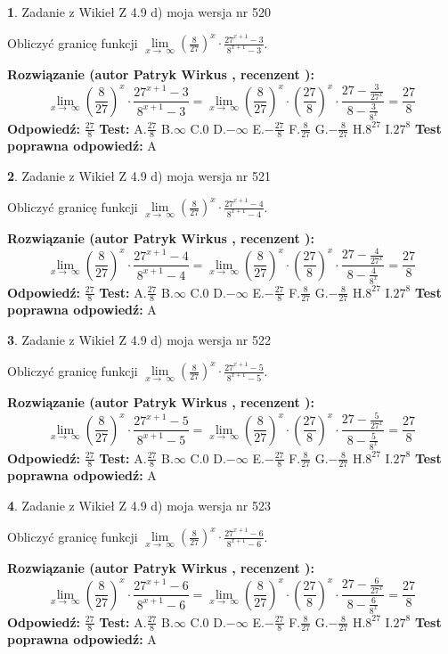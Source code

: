\documentclass[12pt, a4paper]{article}
\theoremstyle{definition} %
\newtheorem{zad}{}
\newcommand{\zadStart}[1]{\begin{zad}#1\newline}
\newcommand{\zadStop}{\end{zad}}
\newcommand{\rozwStart}[2]{\noindent \textbf{Rozwiązanie (autor #1 , recenzent #2): }\newline}
\newcommand{\rozwStop}{\newline}
\newcommand{\odpStart}{\noindent \textbf{Odpowiedź:}\newline}
\newcommand{\odpStop}{\newline}
\newcommand{\testStart}{\noindent \textbf{Test:}\newline}
\newcommand{\testStop}{\newline}
\newcommand{\kluczStart}{\noindent \textbf{Test poprawna odpowiedź:}\newline}
\newcommand{\kluczStop}{\newline}
\begin{document}
\zadStart{Zadanie z Wikieł Z 4.9 d) moja wersja nr 520}


Obliczyć granicę funkcji  $\lim\limits_{x\to\ \infty}(\frac{8}{27})^{x}\cdot\frac{27^{x+1}-3}{8^{x+1}-3}$.
\zadStop
\rozwStart{Patryk Wirkus}{}
$$\lim\limits_{x\to\ \infty}(\frac{8}{27})^{x}\cdot\frac{27^{x+1}-3}{8^{x+1}-3}=\lim\limits_{x\to\ \infty}(\frac{8}{27})^{x}\cdot(\frac{27}{8})^{x} \cdot \frac{27-\frac{3}{27^{x}}}{8-\frac{3}{8^{x}}} = \frac{27}{8}$$
\rozwStop
\odpStart
$\frac{27}{8}$
\odpStop
\testStart
A.$\frac{27}{8}$ B.$\infty$ C.$0$ D.$-\infty$ E.$-\frac{27}{8}$
F.$\frac{8}{27}$ G.$-\frac{8}{27}$
H.$8^{27}$
I.$27^{8}$
\testStop
\kluczStart
A
\kluczStop



\zadStart{Zadanie z Wikieł Z 4.9 d) moja wersja nr 521}


Obliczyć granicę funkcji  $\lim\limits_{x\to\ \infty}(\frac{8}{27})^{x}\cdot\frac{27^{x+1}-4}{8^{x+1}-4}$.
\zadStop
\rozwStart{Patryk Wirkus}{}
$$\lim\limits_{x\to\ \infty}(\frac{8}{27})^{x}\cdot\frac{27^{x+1}-4}{8^{x+1}-4}=\lim\limits_{x\to\ \infty}(\frac{8}{27})^{x}\cdot(\frac{27}{8})^{x} \cdot \frac{27-\frac{4}{27^{x}}}{8-\frac{4}{8^{x}}} = \frac{27}{8}$$
\rozwStop
\odpStart
$\frac{27}{8}$
\odpStop
\testStart
A.$\frac{27}{8}$ B.$\infty$ C.$0$ D.$-\infty$ E.$-\frac{27}{8}$
F.$\frac{8}{27}$ G.$-\frac{8}{27}$
H.$8^{27}$
I.$27^{8}$
\testStop
\kluczStart
A
\kluczStop



\zadStart{Zadanie z Wikieł Z 4.9 d) moja wersja nr 522}


Obliczyć granicę funkcji  $\lim\limits_{x\to\ \infty}(\frac{8}{27})^{x}\cdot\frac{27^{x+1}-5}{8^{x+1}-5}$.
\zadStop
\rozwStart{Patryk Wirkus}{}
$$\lim\limits_{x\to\ \infty}(\frac{8}{27})^{x}\cdot\frac{27^{x+1}-5}{8^{x+1}-5}=\lim\limits_{x\to\ \infty}(\frac{8}{27})^{x}\cdot(\frac{27}{8})^{x} \cdot \frac{27-\frac{5}{27^{x}}}{8-\frac{5}{8^{x}}} = \frac{27}{8}$$
\rozwStop
\odpStart
$\frac{27}{8}$
\odpStop
\testStart
A.$\frac{27}{8}$ B.$\infty$ C.$0$ D.$-\infty$ E.$-\frac{27}{8}$
F.$\frac{8}{27}$ G.$-\frac{8}{27}$
H.$8^{27}$
I.$27^{8}$
\testStop
\kluczStart
A
\kluczStop



\zadStart{Zadanie z Wikieł Z 4.9 d) moja wersja nr 523}


Obliczyć granicę funkcji  $\lim\limits_{x\to\ \infty}(\frac{8}{27})^{x}\cdot\frac{27^{x+1}-6}{8^{x+1}-6}$.
\zadStop
\rozwStart{Patryk Wirkus}{}
$$\lim\limits_{x\to\ \infty}(\frac{8}{27})^{x}\cdot\frac{27^{x+1}-6}{8^{x+1}-6}=\lim\limits_{x\to\ \infty}(\frac{8}{27})^{x}\cdot(\frac{27}{8})^{x} \cdot \frac{27-\frac{6}{27^{x}}}{8-\frac{6}{8^{x}}} = \frac{27}{8}$$
\rozwStop
\odpStart
$\frac{27}{8}$
\odpStop
\testStart
A.$\frac{27}{8}$ B.$\infty$ C.$0$ D.$-\infty$ E.$-\frac{27}{8}$
F.$\frac{8}{27}$ G.$-\frac{8}{27}$
H.$8^{27}$
I.$27^{8}$
\testStop
\kluczStart
A
\kluczStop
\end{document}
